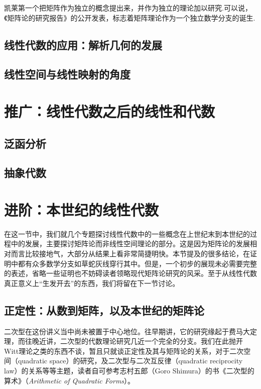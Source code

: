 \documentclass{ctexbook}
\begin{document}
凯莱第一个把矩阵作为独立的概念提出来，并作为独立的理论加以研究.可以说，《矩阵论的研究报告》的公开发表，标志着矩阵理论作为一个独立数学分支的诞生.

\subsection{线性代数的应用：解析几何的发展}


\subsection{线性空间与线性映射的角度}

\section{推广：线性代数之后的线性和代数}
\subsection{泛函分析}


\subsection{抽象代数}


\section{进阶：本世纪的线性代数}

在这一节中，我们就几个专题探讨线性代数中的一些概念在上世纪末到本世纪的过程中的发展，主要探讨矩阵论而非线性空间理论的部分。这是因为矩阵论的发展相对而言比较接地气，大部分从结果上看非常简捷明快。本节提及的很多结论，在证明中都有众多数学分支如草蛇灰线穿行其中。但是，一个初步的展现未必需要完整的表述，省略一些证明也不妨碍读者领略现代矩阵论研究的风采。至于从线性代数真正意义上“生发开去”的东西，我们将留在下一节讨论。

\subsection{正定性：从数到矩阵，以及本世纪的矩阵论}

二次型在这份讲义当中尚未被置于中心地位。往早期讲，它的研究缘起于费马大定理，而往晚近讲，二次型的代数理论研究几近一个完全的分支。我们在此抛开Witt理论之类的东西不谈，暂且只就谈正定性及其与矩阵论的关系，对于二次空间（quadratic space）的研究，及二次型与二次互反律（quadratic reciprocity law）的关系等等主题，读者自可参考志村五郎（Goro Shimura）的书《二次型的算术》（\textit{Arithmetic of Quadratic Forms}）。
\end{document}
